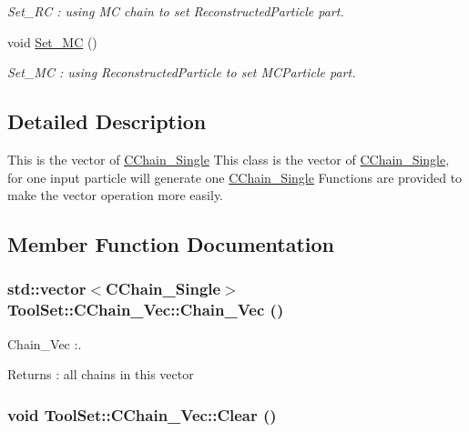 \begin{DoxyCompactItemize}
\begin{DoxyCompactList}\small\item\em Set\_\-RC : using MC chain to set ReconstructedParticle part. \item\end{DoxyCompactList}\item 
\hypertarget{classToolSet_1_1CChain__Vec_ab706092b55510c69a2154b2a69c78e55}{
void \hyperlink{classToolSet_1_1CChain__Vec_ab706092b55510c69a2154b2a69c78e55}{Set\_\-MC} ()}
\label{classToolSet_1_1CChain__Vec_ab706092b55510c69a2154b2a69c78e55}

\begin{DoxyCompactList}\small\item\em Set\_\-MC : using ReconstructedParticle to set MCParticle part. \item\end{DoxyCompactList}\end{DoxyCompactItemize}


\subsection{Detailed Description}
This is the vector of \hyperlink{classToolSet_1_1CChain__Single}{CChain\_\-Single} This class is the vector of \hyperlink{classToolSet_1_1CChain__Single}{CChain\_\-Single}, for one input particle will generate one \hyperlink{classToolSet_1_1CChain__Single}{CChain\_\-Single} Functions are provided to make the vector operation more easily. 

\subsection{Member Function Documentation}
\hypertarget{classToolSet_1_1CChain__Vec_ace17e3ec32dca382602d0ccc9f2d377e}{
\subsubsection[{Chain\_\-Vec}]{\setlength{\rightskip}{0pt plus 5cm}std::vector$<${\bf CChain\_\-Single}$>$ ToolSet::CChain\_\-Vec::Chain\_\-Vec ()}}
\label{classToolSet_1_1CChain__Vec_ace17e3ec32dca382602d0ccc9f2d377e}


Chain\_\-Vec :. \begin{DoxyReturn}{Returns}
: all chains in this vector 
\end{DoxyReturn}
\hypertarget{classToolSet_1_1CChain__Vec_a3068461a3bd0fe085f522e6bb2d24f07}{
\subsubsection[{Clear}]{\setlength{\rightskip}{0pt plus 5cm}void ToolSet::CChain\_\-Vec::Clear ()}}
\label{classToolSet_1_1CChain__Vec_a3068461a3bd0fe085f522e6bb2d24f07}


